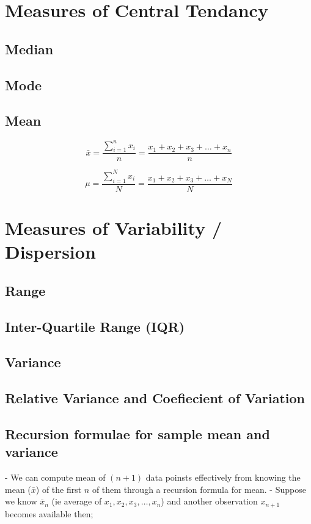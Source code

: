 \documentclass[12pt,a4paper]{article}
\begin{document}
\section{Measures of Central Tendancy}

\subsection{Median}
\subsection{Mode}
\subsection{Mean}

\begin{equation}
    \bar{x} = \frac{\sum_{i = 1}^{n} x_i}{n}= \frac{x_1 + x_2 + x_3 + \ldots + x_n}{n}
\end{equation}

\begin{equation}
    \mu = \frac{\sum_{i = 1}^{N} x_i}{N}= \frac{x_1 + x_2 + x_3 + \ldots + x_N}{N}
\end{equation}


\section{Measures of Variability / Dispersion}

\subsection{Range}
\subsection{Inter-Quartile Range (IQR)}
\subsection{Variance}
\subsection{Relative Variance and Coefiecient of Variation}
\subsection{Recursion formulae for sample mean and variance}
- We can compute mean of $(n + 1)$ data poinsts effectively from knowing the mean ($\bar{x}$) of the first $n$ of them through a recursion formula for mean.
- Suppose we know $\bar{x}_{n}$ (ie average of $x_1, x_2, x_3, \dots, x_n$) and another observation $x_{n+1}$ becomes available then;
\end{document}
